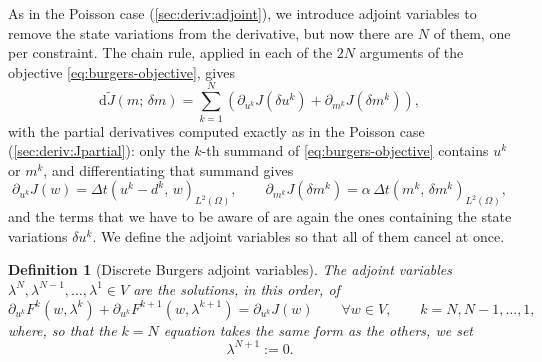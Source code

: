 \documentclass[a4paper,11pt]{article}
\newcommand{\Om}{\Omega}
\newcommand{\Lp}[1]{L^{2}(#1)}              %
\newcommand{\inner}[3]{(#1,\,#2)_{#3}}        %
\newcommand{\Jt}{\tilde{J}}                  %
\theoremstyle{spacedplain} \newtheorem{theorem}[counter]{Theorem} \newtheorem{lemma}[counter]{Lemma} \newtheorem{prop}[counter]{Proposition} \newtheorem{cor}[counter]{Corollary}
\theoremstyle{spaceddefinition} \newtheorem{defn}[counter]{Definition} \newtheorem{example}[counter]{Example} \newtheorem{remark}[counter]{Remark}
\begin{document}
As in the Poisson case (\cref{sec:deriv:adjoint}), we introduce adjoint variables to remove the state variations from the derivative, but now there are $N$ of them, one per constraint. The chain rule, applied in each of the $2N$ arguments of the objective \cref{eq:burgers-objective}, gives
\begin{equation}
  \mathrm{d}\Jt(m;\, \delta m)
  = \sum_{k=1}^{N}
    \left(
      \partial_{u^k} J(\delta u^k)
      + \partial_{m^k} J(\delta m^k)
    \right),
\end{equation}
with the partial derivatives computed exactly as in the Poisson case (\cref{sec:deriv:Jpartial}): only the $k$-th summand of \cref{eq:burgers-objective} contains $u^k$ or $m^k$, and differentiating that summand gives
\begin{equation}
  \label{eq:burgers-Jpartials}
  \partial_{u^k} J(w) = \Delta t \inner{u^k - d^k}{w}{\Lp{\Om}},
  \qquad
  \partial_{m^k} J(\delta m^k)
  = \alpha\, \Delta t \inner{m^k}{\delta m^k}{\Lp{\Om}},
\end{equation}
and the terms that we have to be aware of are again the ones containing the state variations $\delta u^k$. We define the adjoint variables so that all of them cancel at once.

\begin{defn}[Discrete Burgers adjoint variables]
\label{defn:burgers-adjoint}
The adjoint variables $\lambda^N, \lambda^{N-1}, \ldots, \lambda^1 \in V$ are the solutions, in this order, of
\begin{equation}
  \label{eq:burgers-adjoint-def}
  \partial_{u^k} F^{k}(w, \lambda^k)
  + \partial_{u^k} F^{k+1}(w, \lambda^{k+1})
  = \partial_{u^k} J(w)
  \qquad \forall w \in V,
  \qquad k = N, N-1, \ldots, 1,
\end{equation}
where, so that the $k = N$ equation takes the same form as the others, we set
\begin{equation}
  \label{eq:burgers-terminal}
  \lambda^{N+1} := 0.
\end{equation}
\end{defn}
\end{document}
